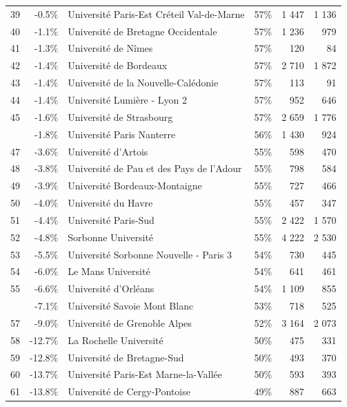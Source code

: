 \documentclass[12pt,french,]{article}
\begin{document}
\begin{longtable}{rrlrrr}
\rowcolor{gray!6}  39 & -0.5\% & Université Paris-Est Créteil Val-de-Marne & 57\% & 1 447 & 1 136\\
40 & -1.1\% & Université de Bretagne Occidentale & 57\% & 1 236 & 979\\
\addlinespace
\rowcolor{gray!6}  41 & -1.3\% & Université de Nîmes & 57\% & 120 & 84\\
42 & -1.4\% & Université de Bordeaux & 57\% & 2 710 & 1 872\\
\rowcolor{gray!6}  43 & -1.4\% & Université de la Nouvelle-Calédonie & 57\% & 113 & 91\\
44 & -1.4\% & Université Lumière - Lyon 2 & 57\% & 952 & 646\\
\rowcolor{gray!6}  45 & -1.6\% & Université de Strasbourg & 57\% & 2 659 & 1 776\\
\addlinespace
46 & -1.8\% & Université Paris Nanterre & 56\% & 1 430 & 924\\
\rowcolor{gray!6}  47 & -3.6\% & Université d'Artois & 55\% & 598 & 470\\
48 & -3.8\% & Université de Pau et des Pays de l'Adour & 55\% & 798 & 584\\
\rowcolor{gray!6}  49 & -3.9\% & Université Bordeaux-Montaigne & 55\% & 727 & 466\\
50 & -4.0\% & Université du Havre & 55\% & 457 & 347\\
\addlinespace
\rowcolor{gray!6}  51 & -4.4\% & Université Paris-Sud & 55\% & 2 422 & 1 570\\
52 & -4.8\% & Sorbonne Université & 55\% & 4 222 & 2 530\\
\rowcolor{gray!6}  53 & -5.5\% & Université Sorbonne Nouvelle - Paris 3 & 54\% & 730 & 445\\
54 & -6.0\% & Le Mans Université & 54\% & 641 & 461\\
\rowcolor{gray!6}  55 & -6.6\% & Université d'Orléans & 54\% & 1 109 & 855\\
\addlinespace
56 & -7.1\% & Université Savoie Mont Blanc & 53\% & 718 & 525\\
\rowcolor{gray!6}  57 & -9.0\% & Université de Grenoble Alpes & 52\% & 3 164 & 2 073\\
58 & -12.7\% & La Rochelle Université & 50\% & 475 & 331\\
\rowcolor{gray!6}  59 & -12.8\% & Université de Bretagne-Sud & 50\% & 493 & 370\\
60 & -13.7\% & Université Paris-Est Marne-la-Vallée & 50\% & 593 & 393\\
\addlinespace
\rowcolor{gray!6}  61 & -13.8\% & Université de Cergy-Pontoise & 49\% & 887 & 663\\

\end{longtable}
\end{document}
